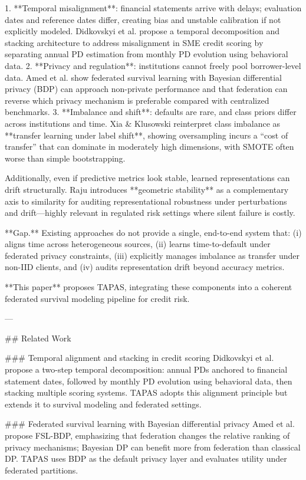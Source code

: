 1. **Temporal misalignment**: financial statements arrive with delays; evaluation dates and reference dates differ, creating bias and unstable calibration if not explicitly modeled. Didkovskyi et al. propose a temporal decomposition and stacking architecture to address misalignment in SME credit scoring by separating annual PD estimation from monthly PD evolution using behavioral data.  
2. **Privacy and regulation**: institutions cannot freely pool borrower-level data. Amed et al. show federated survival learning with Bayesian differential privacy (BDP) can approach non-private performance and that federation can reverse which privacy mechanism is preferable compared with centralized benchmarks.  
3. **Imbalance and shift**: defaults are rare, and class priors differ across institutions and time. Xia & Klusowski reinterpret class imbalance as **transfer learning under label shift**, showing oversampling incurs a “cost of transfer” that can dominate in moderately high dimensions, with SMOTE often worse than simple bootstrapping.

Additionally, even if predictive metrics look stable, learned representations can drift structurally. Raju introduces **geometric stability** as a complementary axis to similarity for auditing representational robustness under perturbations and drift—highly relevant in regulated risk settings where silent failure is costly.

**Gap.** Existing approaches do not provide a single, end-to-end system that: (i) aligns time across heterogeneous sources, (ii) learns time-to-default under federated privacy constraints, (iii) explicitly manages imbalance as transfer under non-IID clients, and (iv) audits representation drift beyond accuracy metrics.

**This paper** proposes TAPAS, integrating these components into a coherent federated survival modeling pipeline for credit risk.

---

## Related Work  

### Temporal alignment and stacking in credit scoring  
Didkovskyi et al. propose a two-step temporal decomposition: annual PDs anchored to financial statement dates, followed by monthly PD evolution using behavioral data, then stacking multiple scoring systems. TAPAS adopts this alignment principle but extends it to survival modeling and federated settings.

### Federated survival learning with Bayesian differential privacy  
Amed et al. propose FSL-BDP, emphasizing that federation changes the relative ranking of privacy mechanisms; Bayesian DP can benefit more from federation than classical DP. TAPAS uses BDP as the default privacy layer and evaluates utility under federated partitions.

